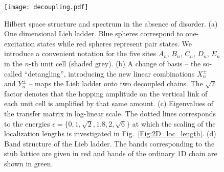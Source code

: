 \documentclass[prl,aps,twocolumn,showpacs,superscriptaddress,longbibliography]{revtex4-1}
\begin{document}
\begin{figure}
\texttt{[image: decoupling.pdf]}
\caption{Hilbert space structure and spectrum in the absence of disorder. (a) One dimensional Lieb ladder. Blue spheres correspond to one-excitation states while red spheres represent pair states. We introduce a convenient notation for the five sites $A_n$, $B_n$, $C_n$, $D_n$, $E_n$ in the $n$-th unit cell (shaded grey). (b) A change of basis -- the so-called ``detangling'', introducing the new linear combinations $X_n^\pm$ and $Y_n^\pm$ \cite{a_Flach_EPL_14,Leykam2017} -- maps the Lieb ladder onto two decoupled chains. The $\sqrt{2}$ factor denotes that the hopping amplitude on the vertical link of each unit cell is amplified by that same amount. (c) Eigenvalues of the transfer matrix in log-linear scale. The dotted lines corresponds to the energies $\epsilon = \{0,1, \sqrt 2, 1.8, 2, \sqrt 6\}$ at which the scaling of the localization lengths is investigated in Fig.~\ref{Fig:2D_loc_length}. (d) Band structure of the Lieb ladder. The bands corresponding to the stub lattice are given in red and bands of the ordinary 1D chain are shown in green.}
\label{Fig:decoupling}
\end{figure}
\end{document}

